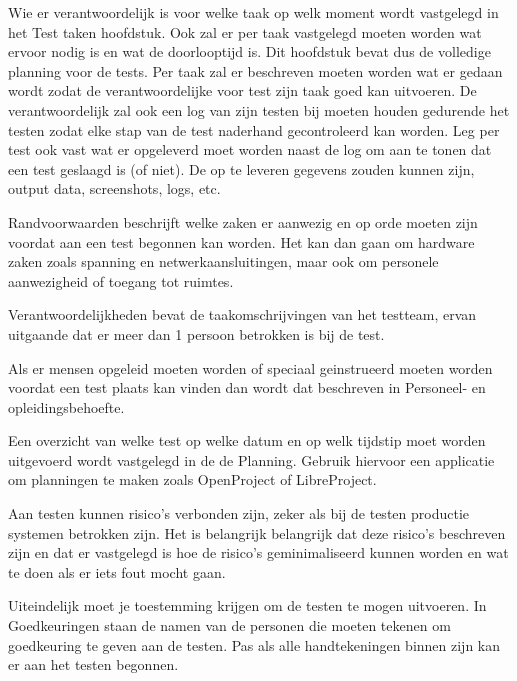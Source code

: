 Wie er verantwoordelijk is voor welke taak op welk moment wordt vastgelegd in het Test taken hoofdstuk. Ook zal er per taak vastgelegd moeten worden wat ervoor nodig is en wat de doorlooptijd is. Dit hoofdstuk bevat dus de volledige planning voor de tests. Per taak zal er beschreven moeten worden wat er gedaan wordt zodat de verantwoordelijke voor test zijn taak goed kan uitvoeren. De verantwoordelijk zal ook een log van zijn testen bij moeten houden gedurende het testen zodat elke stap van de test naderhand gecontroleerd kan worden. Leg per test ook vast wat er opgeleverd moet worden naast de log om aan te tonen dat een test geslaagd is (of niet). De op te leveren gegevens zouden kunnen zijn, output data, screenshots, logs, etc.

Randvoorwaarden beschrijft welke zaken er aanwezig en op orde moeten zijn voordat aan een test begonnen kan worden. Het kan dan gaan om hardware zaken zoals spanning en netwerkaansluitingen, maar ook om personele aanwezigheid of toegang tot ruimtes.

Verantwoordelijkheden bevat de taakomschrijvingen van het testteam, ervan uitgaande dat er meer dan 1 persoon betrokken is bij de test.

Als er mensen opgeleid moeten worden of speciaal geinstrueerd moeten worden voordat een test plaats kan vinden dan wordt dat beschreven in Personeel- en opleidingsbehoefte.

Een overzicht van welke test op welke datum en op welk tijdstip moet worden uitgevoerd wordt vastgelegd in de de Planning. Gebruik hiervoor een applicatie om planningen te maken zoals OpenProject of LibreProject.

Aan testen kunnen risico's verbonden zijn, zeker als bij de testen productie systemen betrokken zijn. Het is belangrijk belangrijk dat deze risico's beschreven zijn en dat er vastgelegd is hoe de risico's geminimaliseerd kunnen worden en wat te doen als er iets fout mocht gaan.

Uiteindelijk moet je toestemming krijgen om de testen te mogen uitvoeren. In Goedkeuringen staan de namen van de personen die moeten tekenen om goedkeuring te geven aan de testen. Pas als alle handtekeningen binnen zijn kan er aan het testen begonnen.
